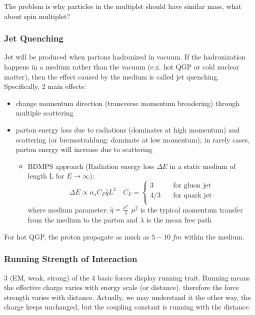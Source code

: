The problem is why particles in the multiplet should have similar mass, what
about spin multiplet?
     
\subsubsection{Jet Quenching}
Jet will be produced when partons hadronized in vacuum. If the hadronization
happens in a medium rather than the vacuum (e.x. hot QGP or cold nuclear matter),
then the effect caused by the medium is called jet quenching. Specifically,
2 main effects:
\begin{itemize}
    \item change momentum direction (transverse momentum broadering) through
	multiple scattering
    \item parton energy loss due to radiations (dominates at high momentum) and 
	scattering (or bremsstrahlung: dominate at low momentum); in rarely cases,
	parton energy will increase due to scattering
	\begin{itemize}
	    \item BDMPS approach (Radiation energy loss $\Delta E$ in a static
		medium of length L for $E \rightarrow \infty$):
		\begin{equation*}
		    \Delta E \propto \alpha_s C_F \hat{q} L^2 
		    \quad
		    C_F = \left\{ 
		    \begin{aligned}
			3	\quad& \text{for gluon jet}	\\
			4/3	\quad& \text{for quark jet}	\\
		    \end{aligned}
		    \right.
		\end{equation*}
		where medium parameter: $\hat{q} = \frac{\mu^2}{\lambda}$
		$\mu^2$ is the typical momentum transfer from the medium to the parton
		and $\lambda$ is the mean free path
	\end{itemize}
\end{itemize}
For hot QGP, the proton propagate as much as $5-10\ fm$ within the medium.



\subsubsection{Running Strength of Interaction}
3 (EM, weak, strong) of the 4 basic forces display running trait. Running 
means the effective charge varies with energy scale (or distance).
therefore the force strength varies with distance. Actually, we may understand
it the other way, the charge keeps unchanged, but the coupling constant is 
running with the distance. 


